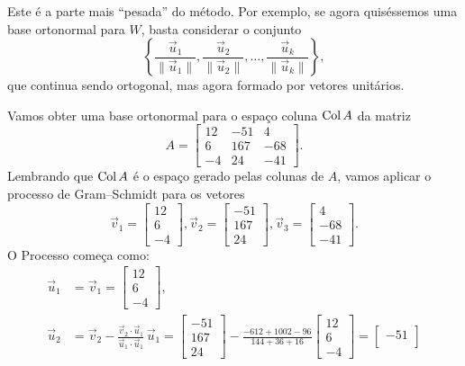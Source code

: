 \documentclass[../livro.tex]{subfiles}  %
\begin{document}
Este é a parte mais ``pesada'' do método. Por exemplo, se agora quiséssemos uma base ortonormal para $W$, basta considerar o conjunto
\[
\left\{ \frac{\vec{u}_1}{\|\vec{u}_1\|}, \frac{\vec{u}_2}{\|\vec{u}_2\|}, \dots, \frac{\vec{u}_k}{\|\vec{u}_k\|} \right\},
\] que continua sendo ortogonal, mas agora formado por vetores unitários.




\begin{example}
Vamos obter uma base ortonormal para o espaço coluna $\operatorname{Col} A$ da matriz
\[
A =
\begin{bmatrix}
12 & -51 & 4 \\
6 & 167 & -68 \\
-4 & 24 & -41
\end{bmatrix}.
\] Lembrando que $\operatorname{Col} A$ é o espaço gerado pelas colunas de $A$, vamos aplicar o processo de Gram--Schmidt para os vetores
\[
\vec{v}_1 =
\begin{bmatrix}
12 \\
6 \\
-4
\end{bmatrix},
\vec{v}_2 =
\begin{bmatrix}
 -51  \\
 167  \\
 24
\end{bmatrix}, \vec{v}_3 =
\begin{bmatrix}
  4 \\
 -68 \\
 -41
\end{bmatrix}.
\] O Processo começa como:
\[
\begin{split}
\vec{u}_1 & = \vec{v}_1 =
\begin{bmatrix}
12 \\
6 \\
-4
\end{bmatrix}, \\
\vec{u}_2 &  = \vec{v}_2 - \frac{\vec{v}_2 \cdot \vec{u}_1}{\vec{u}_1 \cdot \vec{u}_1} \, \vec{u}_1 =
\begin{bmatrix}
 -51  \\
 167  \\
 24
\end{bmatrix} - \frac{-612 +1002 - 96}{144 + 36 + 16}
\begin{bmatrix}
12 \\
6 \\
-4
\end{bmatrix} =
\begin{bmatrix}
 -51  \\

\end{bmatrix}
\end{split}\]
\end{example}
\end{document}

